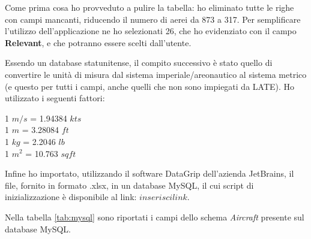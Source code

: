 \documentclass[a4paper, 12pt]{article}
\begin{document}
		Come prima cosa ho provveduto a pulire la tabella: ho eliminato tutte le righe con campi mancanti, riducendo il numero di aerei da 873 a 317. Per semplificare l’utilizzo dell’applicazione ne ho selezionati 26, che ho evidenziato con il campo \textbf{Relevant}, e che potranno essere scelti dall'utente.
		
		Essendo un database statunitense, il compito successivo è stato quello di convertire le unità di misura dal sistema imperiale/areonautico al sistema metrico (e questo per tutti i campi, anche quelli che non sono impiegati da LATE). Ho utilizzato i seguenti fattori:
		\begin{center}
				1 $m/s$ = 1.94384 $kts$ \\
				1 $m$ = 3.28084 $ft$ \\
				1 $kg$ = 2.2046 $lb$ \\
				1 $m^2$ = 10.763 $sqft$ \\
		\end{center}

		Infine ho importato, utilizzando il software DataGrip dell’azienda JetBrains, il file, fornito in formato .xlsx, in un database MySQL, il cui script di inizializzazione è disponibile al link: $inserisci link$. 

		Nella tabella \ref{tab:mysql} sono riportati i campi dello schema \textit{Aircraft} presente sul database MySQL.

\begin{table}[H]

\caption{Campi MySQL utilizzati da LATE}
\label{tab:mysql}

\bgroup
\def\arraystretch{1.5}

\egroup
\end{table}
\end{document}
